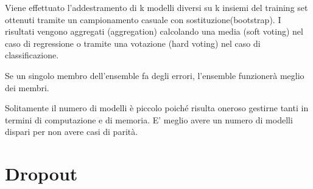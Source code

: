 Viene effettuato l'addestramento di k modelli diversi su k insiemi del training set ottenuti tramite un campionamento casuale con sostituzione\footnotemark (bootstrap).
I risultati vengono aggregati (aggregation) calcolando una media (soft voting) nel caso di regressione o tramite una votazione (hard voting) nel caso di classificazione.

Se un singolo membro dell'ensemble fa degli errori, l'ensemble funzionerà meglio dei membri.

Solitamente il numero di modelli è piccolo poiché risulta oneroso gestirne tanti in termini di computazione e di memoria. 
E' meglio avere un numero di modelli dispari per non avere casi di parità.


\section{Dropout}
